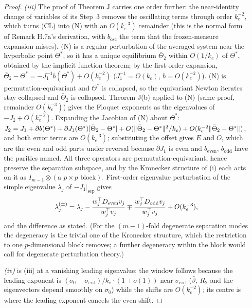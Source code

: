 \begin{proof}
\smallskip
\textit{(iii)} The proof of Theorem J carries one order further: the near-identity change of variables of its Step~3
removes the oscillating terms through order $k_e^{-2}$, which turns \textup{(CL)} into \textup{(N)} with an
$O(k_e^{-3})$ remainder (this is the normal form of Remark H.7a's derivation, with $b_{\mathrm{osc}}$ the term that
the frozen-measure expansion misses). \textup{(N)} is a regular perturbation of the averaged system near the
hyperbolic point $\Theta^*$, so it has a unique equilibrium $\bar\Theta_2$ within $O(1/k_e)$ of $\Theta^*$, obtained
by the implicit function theorem; by the first-order expansion,
$\bar\Theta_2 - \Theta^* = -J_1^{-1}b(\Theta^*) + O(k_e^{-2})$ ($J_1^{-1} = O(k_e)$, $b = O(k_e^{-2})$). \textup{(N)}
is permutation-equivariant and $\Theta^*$ is collapsed, so the equivariant Newton iterates stay collapsed and
$\bar\Theta_2$ is collapsed. Theorem J(b) applied to \textup{(N)} (same proof, remainder $O(k_e^{-3})$) gives the
Floquet exponents as the eigenvalues of $-J_2 + O(k_e^{-3})$. Expanding the Jacobian of \textup{(N)} about $\Theta^*$:
$J_2 = J_1 + \partial b(\Theta^*) + \partial J_1(\Theta^*)[\bar\Theta_2 - \Theta^*]
+ O(\lVert \bar\Theta_2 - \Theta^*\rVert^2/k_e) + O(k_e^{-2}\lVert \bar\Theta_2 - \Theta^*\rVert)$, and both error terms are
$O(k_e^{-3})$; substituting the offset gives $E$ and $O$, which are the even and odd parts under reversal because
$\partial J_1$ is even and $b_{\mathrm{even}}$, $b_{\mathrm{odd}}$ have the parities named. All three operators are
permutation-equivariant, hence preserve the separation subspace, and by the Kronecker structure of \textup{(i)} each
acts on it as $I_{m-1}\otimes(\text{a $p\times p$ block})$. First-order eigenvalue perturbation of the simple
eigenvalue $\lambda_j$ of $-J_1|_{\mathrm{sep}}$ gives
\[
  \lambda_j^{(\pm)} = \lambda_j - \frac{w_j^\top D_{\mathrm{even}}v_j}{w_j^\top v_j}
  \mp \frac{w_j^\top D_{\mathrm{odd}}v_j}{w_j^\top v_j} + O(k_e^{-3}),
\]
and the difference as stated. (For the $(m-1)$-fold degenerate separation modes the degeneracy is the trivial one of
the Kronecker structure, which the restriction to one $p$-dimensional block removes; a further degeneracy within the
block would call for degenerate perturbation theory.)

\smallskip
\textit{(iv)} is \textup{(iii)} at a vanishing leading eigenvalue; the window follows because the leading exponent is
$(\sigma_0 - \sigma_{\mathrm{crit}})/k_e\cdot(1 + o(1))$ near $\sigma_{\mathrm{crit}}$ ($\bar\vartheta$, $R_2$ and
the eigenvectors depend smoothly on $\sigma_0$) while the shifts are $O(k_e^{-2})$; its centre is where the leading
exponent cancels the even shift.
\end{proof}

